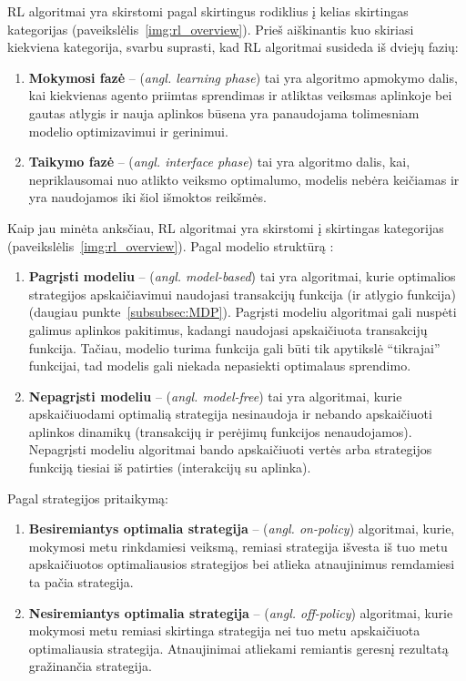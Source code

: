 \documentclass{VUMIFPSbakalaurinis}
\begin{document}
{	RL algoritmai yra skirstomi pagal skirtingus rodiklius į kelias skirtingas kategorijas \cite{kindsOfRlAlgorithms} (paveikslėlis~\ref{img:rl_overview}). Prieš aiškinantis kuo skiriasi kiekviena kategorija, svarbu suprasti, kad RL algoritmai susideda iš dviejų fazių:
	
	\begin{enumerate}
		\item \textbf{Mokymosi fazė} -- (\textit{angl. learning phase}) tai yra algoritmo apmokymo dalis, kai kiekvienas agento priimtas sprendimas ir atliktas veiksmas aplinkoje bei gautas atlygis ir nauja aplinkos būsena yra panaudojama tolimesniam modelio optimizavimui ir gerinimui.
		\item \textbf{Taikymo fazė} -- (\textit{angl. interface phase}) tai yra algoritmo dalis, kai, nepriklausomai nuo atlikto veiksmo optimalumo, modelis nebėra keičiamas ir yra naudojamos iki šiol išmoktos reikšmės.
	\end{enumerate}

	 Kaip jau minėta anksčiau, RL algoritmai yra skirstomi į skirtingas kategorijas (paveikslėlis~\ref{img:rl_overview}). Pagal modelio struktūrą \cite{kindsOfRlAlgorithms}:
	 
	\begin{enumerate}
		\item \textbf{Pagrįsti modeliu} -- (\textit{angl. model-based}) tai yra algoritmai, kurie optimalios strategijos apskaičiavimui naudojasi transakcijų funkcija (ir atlygio funkcija) (daugiau punkte~\ref{subsubsec:MDP}). Pagrįsti modeliu algoritmai gali nuspėti galimus aplinkos pakitimus, kadangi naudojasi apskaičiuota transakcijų funkcija. Tačiau, modelio turima funkcija gali būti tik apytikslė \enquote{tikrajai} funkcijai, tad modelis gali niekada nepasiekti optimalaus sprendimo. 
		\item \textbf{Nepagrįsti modeliu} -- (\textit{angl. model-free}) tai yra algoritmai, kurie apskaičiuodami optimalią strategija nesinaudoja ir nebando apskaičiuoti aplinkos dinamikų (transakcijų ir perėjimų funkcijos nenaudojamos). Nepagrįsti modeliu algoritmai bando apskaičiuoti vertės arba strategijos funkciją tiesiai iš patirties (interakcijų su aplinka).
	\end{enumerate}

	Pagal strategijos pritaikymą:
	
	\begin{enumerate}
		\item \textbf{Besiremiantys optimalia strategija} -- (\textit{angl. on-policy}) algoritmai, kurie, mokymosi metu rinkdamiesi veiksmą, remiasi strategija išvesta iš tuo metu apskaičiuotos optimaliausios strategijos bei atlieka atnaujinimus remdamiesi ta pačia strategija.
		\item \textbf{Nesiremiantys optimalia strategija} -- (\textit{angl. off-policy}) algoritmai, kurie mokymosi metu remiasi skirtinga strategija nei tuo metu apskaičiuota optimaliausia strategija. Atnaujinimai atliekami remiantis geresnį rezultatą gražinančia strategija.
	\end{enumerate}

}
\end{document}
